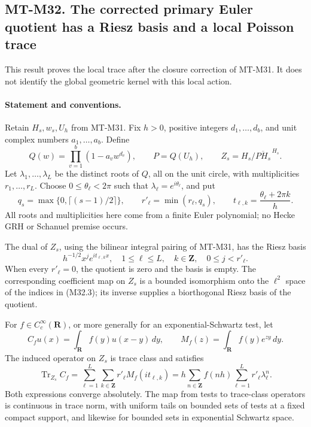 \subsection*{MT-M32. The corrected primary Euler quotient has a Riesz basis
and a local Poisson trace}

This result proves the local trace after the closure correction
of MT-M31.  It does not identify the global geometric kernel
with this local action.

\paragraph{Statement and conventions.}
Retain $H_s,w_s,U_h$ from MT-M31.  Fix $h>0$, positive
integers $d_1,\ldots,d_b$, and unit complex numbers
$a_1,\ldots,a_b$.  Define
\[
 Q(w)=\prod_{v=1}^{b}(1-a_vw^{d_v}),\qquad
 P=Q(U_h),\qquad
 Z_s=H_s/\overline{PH_s}^{\,H_s}.
 \tag{M32.1}
\]
Let $\lambda_1,\ldots,\lambda_L$ be the distinct roots
of $Q$, all on the unit circle, with multiplicities
$r_1,\ldots,r_L$.  Choose $0\leq\theta_\ell<2\pi$
such that $\lambda_\ell=e^{i\theta_\ell}$, and put
\[
 q_s=\max\{0,\lceil(s-1)/2\rceil\},\qquad
 r'_\ell=\min(r_\ell,q_s),\qquad
 t_{\ell,k}=\frac{\theta_\ell+2\pi k}{h}.
 \tag{M32.2}
\]
All roots and multiplicities here come from a finite Euler
polynomial; no Hecke GRH or Schanuel premise occurs.

The dual of $Z_s$, using the bilinear integral pairing of
MT-M31, has the Riesz basis
\[
 h^{-1/2}x^j e^{it_{\ell,k}x},
 \quad 1\leq\ell\leq L,\quad k\in\mathbf Z,
                  \quad0\leq j<r'_\ell.
 \tag{M32.3}
\]
When every $r'_\ell=0$, the quotient is zero and the basis
is empty.  The corresponding coefficient map on $Z_s$
is a bounded isomorphism onto the $\ell^2$ space of the
indices in (M32.3); its inverse supplies a biorthogonal
Riesz basis of the quotient.

For $f\in C_c^\infty(\mathbf R)$, or more generally for
an exponential-Schwartz test, let
\[
 C_f u(x)=\int_{\mathbf R}f(y)u(x-y)\,dy,
 \qquad M_f(z)=\int_{\mathbf R}f(y)e^{zy}\,dy.
 \tag{M32.4}
\]
The induced operator on $Z_s$ is trace class and satisfies
\[
 \operatorname{Tr}_{Z_s} C_f
      =\sum_{\ell=1}^{L}\sum_{k\in\mathbf Z}
                           r'_\ell M_f(it_{\ell,k})
      =h\sum_{n\in\mathbf Z}f(nh)
                          \sum_{\ell=1}^{L}r'_\ell\lambda_\ell^n.
 \tag{M32.5}
\]
Both expressions converge absolutely.  The map from tests
to trace-class operators is continuous in trace norm, with
uniform tails on bounded sets of tests at a fixed compact
support, and likewise for bounded sets in exponential
Schwartz space.


